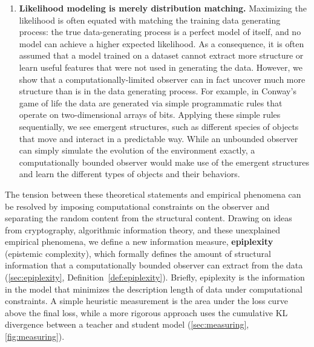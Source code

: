 \documentclass[twoside]{article}
\begin{document}
\begin{enumerate}
    \item \textbf{Likelihood modeling is merely distribution matching.}
    Maximizing the likelihood is often equated with matching the training data generating process: the true data-generating process is a perfect model of itself, and no model can achieve a higher expected likelihood. 
    As a consequence, it is often assumed that a model trained on a dataset cannot extract more structure or learn useful features that were not used in generating the data.
    However, we show that a computationally-limited observer can in fact uncover much more structure than is in the data generating process. 
    For example, in Conway's game of life the data are generated via simple programmatic rules that operate on two-dimensional arrays of bits.
    Applying these simple rules sequentially, we see emergent structures, such as different species of objects that move and interact in a predictable way.
    While an unbounded observer can simply simulate the evolution of the environment exactly, a computationally bounded observer would make use of the emergent structures and learn the different types of objects and their behaviors. 
 
\end{enumerate}



The tension between these theoretical statements and empirical phenomena can be resolved by imposing computational constraints on the observer and separating the random content from the structural content. Drawing on ideas from cryptography, algorithmic information theory, and these unexplained empirical phenomena, we define a new information measure, \textbf{epiplexity} (epistemic complexity), which formally defines the amount of structural information that a computationally bounded observer can extract from the data (\autoref{sec:epiplexity}, Definition~\ref{def:epiplexity}).
Briefly, epiplexity is the information in the model that minimizes the description length of data under computational constraints. A simple heuristic measurement is the area under the loss curve above the final loss, while a more rigorous approach uses the cumulative KL divergence between a teacher and student model (\autoref{sec:measuring}, \autoref{fig:measuring}).
\end{document}
